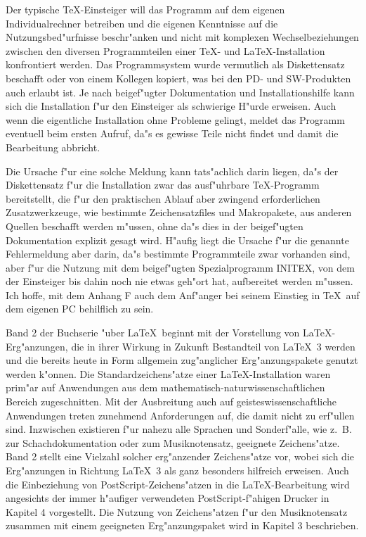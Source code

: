 \documentclass{article}
\begin{document}
Der typische \TeX-Einsteiger will das Programm auf dem eigenen 
Individualrechner betreiben und die eigenen Kenntnisse auf die 
Nutzungsbed"urfnisse beschr"anken und nicht mit komplexen Wechselbeziehungen
zwischen den diversen Programmteilen einer \TeX- und \LaTeX-Installation
konfrontiert werden. Das Programmsystem wurde vermutlich als Diskettensatz
beschafft oder von einem Kollegen kopiert, was bei den PD- und SW-Produkten
auch erlaubt ist. Je nach beigef"ugter Dokumentation und Installationshilfe
kann sich die Installation f"ur den Einsteiger als schwierige H"urde erweisen.
Auch wenn die eigentliche Installation ohne Probleme gelingt, meldet das
Programm eventuell beim ersten Aufruf, da"s es gewisse Teile nicht findet und
damit die Bearbeitung abbricht.          

Die Ursache f"ur eine solche Meldung kann tats"achlich darin liegen, da"s
der Diskettensatz f"ur die Installation zwar das ausf"uhrbare \TeX-Programm
bereitstellt, die f"ur den praktischen Ablauf aber zwingend erforderlichen
Zusatzwerkzeuge, wie bestimmte Zeichensatzfiles und Makropakete, aus anderen
Quellen beschafft werden m"ussen, ohne da"s dies in der beigef"ugten
Dokumentation explizit gesagt wird. H"aufig liegt die Ursache f"ur die
genannte Fehlermeldung aber darin, da"s bestimmte Programmteile zwar vorhanden
sind, aber f"ur die Nutzung mit dem beigef"ugten Spezialprogramm INITEX, 
von dem der Einsteiger bis dahin noch nie etwas geh"ort hat, aufbereitet werden
m"ussen.  Ich hoffe, mit dem Anhang F auch dem Anf"anger 
bei seinem Einstieg in \TeX\ auf dem eigenen PC behilflich  zu sein.

Band 2 der Buchserie "uber \LaTeX\ beginnt mit der Vorstellung von 
\LaTeX-Erg"anzungen, die in ihrer Wirkung in Zukunft Bestandteil von
\LaTeX~3 werden und die bereits heute in Form allgemein zug"anglicher
Erg"anzungspakete genutzt werden k"onnen. Die Standardzeichens"atze einer
\LaTeX-Installation waren prim"ar auf Anwendungen aus dem
mathematisch-naturwissenschaftlichen Bereich zugeschnitten. 
Mit der Ausbreitung auch auf geisteswissenschaftliche Anwendungen treten
zunehmend Anforderungen auf, die damit nicht zu erf"ullen sind. Inzwischen
existieren f"ur nahezu alle Sprachen und Sonderf"alle, wie z.~B. zur
Schachdokumentation oder zum Musiknotensatz, geeignete Zeichens"atze.
Band 2 stellt eine Vielzahl solcher erg"anzender Zeichens"atze vor, wobei sich
die Erg"anzungen in Richtung \LaTeX~3 als ganz besonders hilfreich erweisen.
Auch die Einbeziehung von PostScript-Zeichens"atzen in die \LaTeX-Bearbeitung
wird angesichts der immer h"aufiger verwendeten PostScript-f"ahigen Drucker
in Kapitel 4 vorgestellt. Die Nutzung von Zeichens"atzen f"ur den Musiknotensatz
zusammen mit einem geeigneten Erg"anzungspaket wird in  Kapitel 3 beschrieben. 
\end{document}
